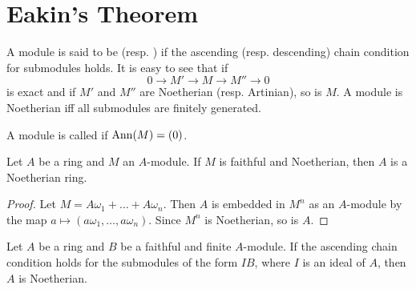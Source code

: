 \documentclass[../main]{subfiles}
\begin{document}
\section{Eakin's Theorem}\label{sec:35}

A module is said to be  (resp. ) if the ascending (resp. descending) chain condition for submodules holds. It is easy to see that if \[0 \longrightarrow M' \longrightarrow M \longrightarrow M'' \longrightarrow 0\] is exact and if $M'$ and $M''$ are Noetherian (resp. Artinian), so is $M$. A module is Noetherian iff all submodules are finitely generated.

A module is called  if $\operatorname{Ann}(M) = (0)$.

\begin{lemma}
Let $A$ be a ring and $M$ an $A$-module. If $M$ is faithful and Noetherian, then $A$ is a Noetherian ring. 
\end{lemma}

\begin{proof}
Let $M = A \omega_1 + \ldots + A \omega_n$. Then $A$ is embedded in $M^n$ as an $A$-module by the map $a \mapsto (a \omega_1,\ldots,a \omega_n)$. Since $M^n$ is Noetherian, so is $A$.
\end{proof}

\begin{theorem}\label{thm:080}
Let $A$ be a ring and $B$ be a faithful and finite $A$-module. If the ascending chain condition holds for the submodules of the form $IB$, where $I$ is an ideal of $A$, then $A$ is Noetherian. 
\end{theorem}
\end{document}
